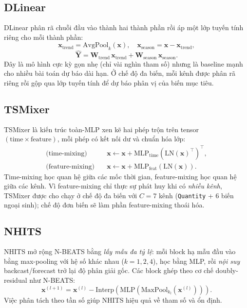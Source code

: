 \documentclass[12pt, a4paper]{report}
\begin{document}
\subsection{DLinear}
DLinear \cite{zeng2023dlinear} phân rã chuỗi đầu vào thành hai thành phần rồi áp một lớp tuyến tính riêng cho mỗi thành phần:
\begin{equation}
  \mathbf{x}_{\text{trend}} = \text{AvgPool}_{k}(\mathbf{x}), \quad
  \mathbf{x}_{\text{season}} = \mathbf{x} - \mathbf{x}_{\text{trend}},
\end{equation}
\begin{equation}
  \hat{\mathbf{Y}} = \mathbf{W}_{\text{trend}}\,\mathbf{x}_{\text{trend}} + \mathbf{W}_{\text{season}}\,\mathbf{x}_{\text{season}}.
\end{equation}
Đây là mô hình cực kỳ gọn nhẹ (chỉ vài nghìn tham số) nhưng là baseline mạnh cho nhiều bài toán dự báo dài hạn. Ở chế độ đa biến, mỗi kênh được phân rã riêng rồi gộp qua lớp tuyến tính để dự báo phân vị của biến mục tiêu.

\subsection{TSMixer}
TSMixer \cite{chen2023tsmixer} là kiến trúc toàn-MLP xen kẽ hai phép trộn trên tensor $(\text{time} \times \text{feature})$, mỗi phép có kết nối dư và chuẩn hóa lớp:
\begin{align}
  \text{(time-mixing)}\quad & \mathbf{x} \leftarrow \mathbf{x} + \text{MLP}_{\text{time}}(\text{LN}(\mathbf{x})^\top)^\top, \\
  \text{(feature-mixing)}\quad & \mathbf{x} \leftarrow \mathbf{x} + \text{MLP}_{\text{feat}}(\text{LN}(\mathbf{x})).
\end{align}
Time-mixing học quan hệ giữa các mốc thời gian, feature-mixing học quan hệ giữa các kênh. Vì feature-mixing chỉ thực sự phát huy khi có \textit{nhiều kênh}, TSMixer được cho chạy ở chế độ đa biến với $C = 7$ kênh (\texttt{Quantity} + 6 biến ngoại sinh); chế độ đơn biến sẽ làm phần feature-mixing thoái hóa.

\subsection{NHITS}
NHITS \cite{challu2023nhits} mở rộng N-BEATS bằng \textit{lấy mẫu đa tỷ lệ}: mỗi block hạ mẫu đầu vào bằng max-pooling với hệ số khác nhau ($k=1,2,4$), học bằng MLP, rồi \textit{nội suy} backcast/forecast trở lại độ phân giải gốc. Các block ghép theo cơ chế doubly-residual như N-BEATS:
\begin{equation}
  \mathbf{x}^{(l+1)} = \mathbf{x}^{(l)} - \text{Interp}\!\left(\text{MLP}(\text{MaxPool}_{k_l}(\mathbf{x}^{(l)}))\right).
\end{equation}
Việc phân tách theo tần số giúp NHITS hiệu quả về tham số và ổn định.
\end{document}
